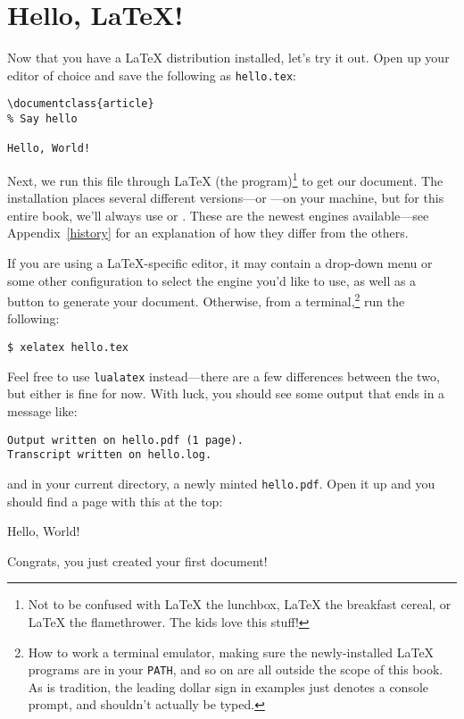 \chapter{Hello, \texorpdfstring{\LaTeX}{LaTeX}!}

Now that you have a \LaTeX{} distribution installed,
let's try it out.
Open up your editor of choice and save the following as \texttt{hello.tex}:
\begin{leftfigure}
\begin{lstlisting}
\documentclass{article}
% Say hello

Hello, World!

\end{lstlisting}
\end{leftfigure}
Next, we run this file through \LaTeX{} (the program)\footnote{Not to be
confused with \LaTeX{} the lunchbox, \LaTeX{} the breakfast cereal,
or \LaTeX{} the flamethrower. The kids love this stuff!}
to get our document.
The installation places several different versions---or
---on your machine,
but for this entire book, we'll always use \LuaLaTeX{} or \XeLaTeX.
These are the newest engines available---see Appendix~\ref{history} for an
explanation of how they differ from the others.

If you are using a \LaTeX{}-specific editor, it may contain a drop-down menu
or some other configuration to select the engine you'd like to use,
as well as a button to generate your document.
Otherwise, from a terminal,\punckern\footnote{How to work a terminal emulator,
making sure the newly-installed \LaTeX{} programs are in your \texttt{PATH},
and so on are all outside the scope of this book.
As is tradition, the leading dollar sign in examples just denotes a console
prompt, and shouldn't actually be typed.}
run the following:
\begin{leftfigure}
\begin{lstlisting}
$ xelatex hello.tex
\end{lstlisting}
\end{leftfigure}
Feel free to use \texttt{lualatex} instead---there are a few differences
between the two, but either is fine for now.
With luck, you should see some output that ends in a message like:
\begin{leftfigure}
\begin{lstlisting}
Output written on hello.pdf (1 page).
Transcript written on hello.log.
\end{lstlisting}
\end{leftfigure}
and in your current directory, a newly minted \texttt{hello.pdf}.
Open it up and you should find a page with this at the top:
\begin{leftfigure}
\lm Hello, World!
\end{leftfigure}
Congrats,
you just created your first document!

